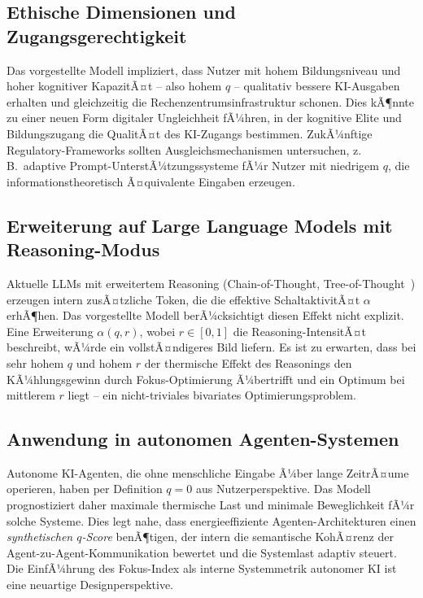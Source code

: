 ﻿\documentclass[a4paper,12pt]{article}
\theoremstyle{definition}
\begin{document}
\subsection{Ethische Dimensionen und Zugangsgerechtigkeit}

Das vorgestellte Modell impliziert, dass Nutzer mit hohem Bildungsniveau und hoher
kognitiver KapazitÃ¤t -- also hohem $q$ -- qualitativ bessere KI-Ausgaben erhalten und
gleichzeitig die Rechenzentrumsinfrastruktur schonen. Dies kÃ¶nnte zu einer neuen Form
digitaler Ungleichheit fÃ¼hren, in der kognitive Elite und Bildungszugang die QualitÃ¤t
des KI-Zugangs bestimmen. ZukÃ¼nftige Regulatory-Frameworks sollten Ausgleichsmechanismen
untersuchen, z.\,B.\ adaptive Prompt-UnterstÃ¼tzungssysteme fÃ¼r Nutzer mit niedrigem $q$,
die informationstheoretisch Ã¤quivalente Eingaben erzeugen.

\subsection{Erweiterung auf Large Language Models mit Reasoning-Modus}

Aktuelle LLMs mit erweitertem Reasoning (Chain-of-Thought, Tree-of-Thought~\cite{Wei2022})
erzeugen intern zusÃ¤tzliche Token, die die effektive SchaltaktivitÃ¤t $\alpha$ erhÃ¶hen.
Das vorgestellte Modell berÃ¼cksichtigt diesen Effekt nicht explizit. Eine Erweiterung
$\alpha(q, r)$, wobei $r \in [0,1]$ die Reasoning-IntensitÃ¤t beschreibt, wÃ¼rde ein
vollstÃ¤ndigeres Bild liefern. Es ist zu erwarten, dass bei sehr hohem $q$ und hohem $r$
der thermische Effekt des Reasonings den KÃ¼hlungsgewinn durch Fokus-Optimierung Ã¼bertrifft
und ein Optimum bei mittlerem $r$ liegt -- ein nicht-triviales bivariates Optimierungsproblem.

\subsection{Anwendung in autonomen Agenten-Systemen}

Autonome KI-Agenten, die ohne menschliche Eingabe Ã¼ber lange ZeitrÃ¤ume operieren, haben
per Definition $q = 0$ aus Nutzerperspektive. Das Modell prognostiziert daher maximale
thermische Last und minimale Beweglichkeit fÃ¼r solche Systeme. Dies legt nahe, dass
energieeffiziente Agenten-Architekturen einen \emph{synthetischen $q$-Score} benÃ¶tigen,
der intern die semantische KohÃ¤renz der Agent-zu-Agent-Kommunikation bewertet und die
Systemlast adaptiv steuert. Die EinfÃ¼hrung des Fokus-Index als interne Systemmetrik
autonomer KI ist eine neuartige Designperspektive.
\end{document}
